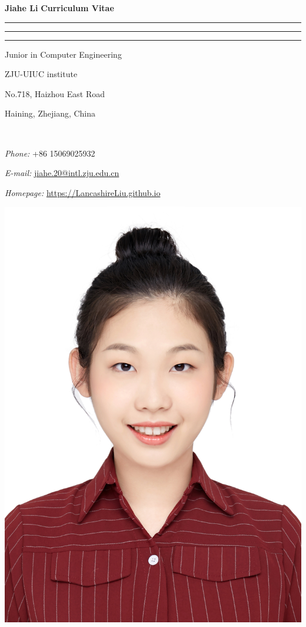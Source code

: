 \documentclass[11pt,english]{article}
\newcommand{\makeheading}[2]%
        {\hspace*{-\marginparsep minus \marginparwidth}%
         \begin{minipage}[t]{\textwidth\marginparwidth\marginparsep}%
         {\LARGE\bfseries #1} \hfill  {\LARGE\bfseries #2 \hspace*{-2.3\marginparsep minus \marginparwidth}}\\[-0.2\baselineskip]%
                 \rule{\textwidth}{1.5pt}\rule{\marginparsep}{1.5pt}\rule{\marginparwidth}{1.5pt}%
         \end{minipage}}
\begin{document}
\makeheading{Jiahe Li}{Curriculum Vitae}


\begin{multicols}{2}

\begin{flushleft}
Junior in Computer Engineering

ZJU-UIUC institute

No.718, Haizhou East Road

Haining, Zhejiang, China


~\       


\textit{Phone:} +86 15069025932

\textit{E-mail:} \href{jiahe.20@intl.zju.edu.cn}{jiahe.20@intl.zju.edu.cn}

\textit{Homepage:} \href{LancashireLiu.github.io}{https://LancashireLiu.github.io}


\end{flushleft}







\begin{flushright}
   \includegraphics[scale=0.3]{img.jpg} 
\end{flushright}
\end{multicols}
\vspace{-.25in}
\end{document}
